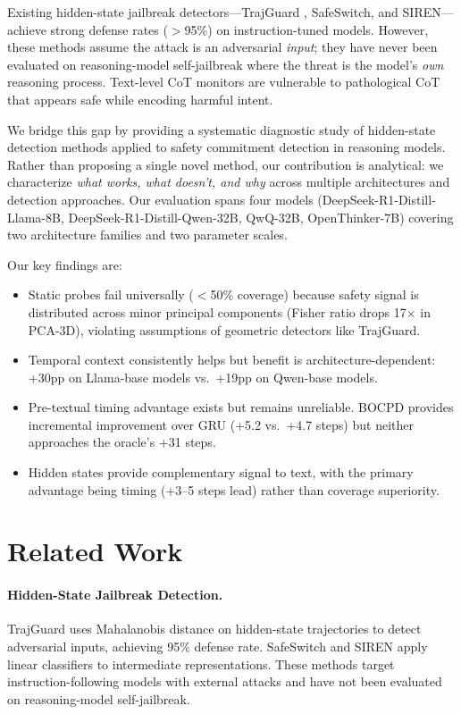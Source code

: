 \documentclass[11pt,a4paper]{article}
\begin{document}
Existing hidden-state jailbreak detectors---TrajGuard \cite{xu2024trajguard}, SafeSwitch, and SIREN---achieve strong defense rates ($>$95\%) on instruction-tuned models. However, these methods assume the attack is an adversarial \emph{input}; they have never been evaluated on reasoning-model self-jailbreak where the threat is the model's \emph{own} reasoning process. Text-level CoT monitors are vulnerable to pathological CoT that appears safe while encoding harmful intent.

We bridge this gap by providing a systematic diagnostic study of hidden-state detection methods applied to safety commitment detection in reasoning models. Rather than proposing a single novel method, our contribution is analytical: we characterize \emph{what works, what doesn't, and why} across multiple architectures and detection approaches. Our evaluation spans four models (DeepSeek-R1-Distill-Llama-8B, DeepSeek-R1-Distill-Qwen-32B, QwQ-32B, OpenThinker-7B) covering two architecture families and two parameter scales.

Our key findings are:
\begin{itemize}
\item Static probes fail universally ($<$50\% coverage) because safety signal is distributed across minor principal components (Fisher ratio drops 17$\times$ in PCA-3D), violating assumptions of geometric detectors like TrajGuard.
\item Temporal context consistently helps but benefit is architecture-dependent: +30pp on Llama-base models vs.\ +19pp on Qwen-base models.
\item Pre-textual timing advantage exists but remains unreliable. BOCPD provides incremental improvement over GRU (+5.2 vs.\ +4.7 steps) but neither approaches the oracle's +31 steps.
\item Hidden states provide complementary signal to text, with the primary advantage being timing (+3--5 steps lead) rather than coverage superiority.
\end{itemize}

\section{Related Work}

\paragraph{Hidden-State Jailbreak Detection.} TrajGuard \cite{xu2024trajguard} uses Mahalanobis distance on hidden-state trajectories to detect adversarial inputs, achieving 95\% defense rate. SafeSwitch and SIREN apply linear classifiers to intermediate representations. These methods target instruction-following models with external attacks and have not been evaluated on reasoning-model self-jailbreak.
\end{document}
